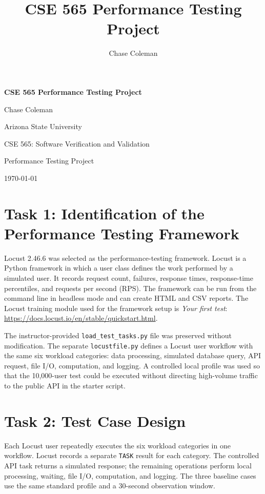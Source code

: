 \documentclass[11pt]{article}
\title{CSE 565 Performance Testing Project}
\author{Chase Coleman}
\date{}
\begin{document}
\begin{titlepage}
  \centering
  \doublespacing
  \vspace*{1in}
  {\Large\textbf{CSE 565 Performance Testing Project}\par}
  \vspace{0.5in}
  Chase Coleman\par
  Arizona State University\par
  CSE 565: Software Verification and Validation\par
  Performance Testing Project\par
  \today\par
\end{titlepage}

\setcounter{page}{2}
\doublespacing

\section{Task 1: Identification of the Performance Testing Framework}

Locust 2.46.6 was selected as the performance-testing framework. Locust is a Python framework in which a user class defines the work performed by a simulated user. It records request count, failures, response times, response-time percentiles, and requests per second (RPS). The framework can be run from the command line in headless mode and can create HTML and CSV reports. The Locust training module used for the framework setup is \textit{Your first test}: \url{https://docs.locust.io/en/stable/quickstart.html}.

The instructor-provided \texttt{load\_test\_tasks.py} file was preserved without modification. The separate \texttt{locustfile.py} defines a Locust user workflow with the same six workload categories: data processing, simulated database query, API request, file I/O, computation, and logging. A controlled local profile was used so that the 10,000-user test could be executed without directing high-volume traffic to the public API in the starter script.

\section{Task 2: Test Case Design}

Each Locust user repeatedly executes the six workload categories in one workflow. Locust records a separate \texttt{TASK} result for each category. The controlled API task returns a simulated response; the remaining operations perform local processing, waiting, file I/O, computation, and logging. The three baseline cases use the same standard profile and a 30-second observation window.
\end{document}
